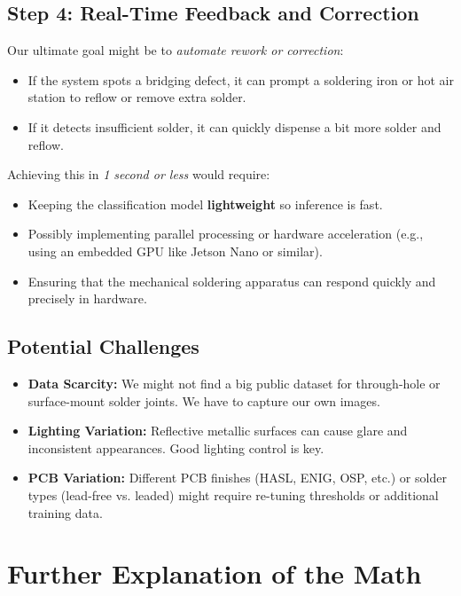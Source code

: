\documentclass{article}
\begin{document}
\subsection{Step 4: Real-Time Feedback and Correction}

Our ultimate goal might be to \emph{automate rework or correction}: 
\begin{itemize}
    \item If the system spots a bridging defect, it can prompt a soldering iron or hot air station to reflow or remove extra solder.
    \item If it detects insufficient solder, it can quickly dispense a bit more solder and reflow.
\end{itemize}
Achieving this in \emph{1 second or less} would require:
\begin{itemize}
    \item Keeping the classification model \textbf{lightweight} so inference is fast.
    \item Possibly implementing parallel processing or hardware acceleration (e.g., using an embedded GPU like Jetson Nano or similar).
    \item Ensuring that the mechanical soldering apparatus can respond quickly and precisely in hardware.
\end{itemize}

\subsection{Potential Challenges}

\begin{itemize}
    \item \textbf{Data Scarcity:} We might not find a big public dataset for through-hole or surface-mount solder joints. We have to capture our own images.
    \item \textbf{Lighting Variation:} Reflective metallic surfaces can cause glare and inconsistent appearances. Good lighting control is key.
    \item \textbf{PCB Variation:} Different PCB finishes (HASL, ENIG, OSP, etc.) or solder types (lead-free vs. leaded) might require re-tuning thresholds or additional training data.
\end{itemize}


\section{Further Explanation of the Math }
\end{document}
